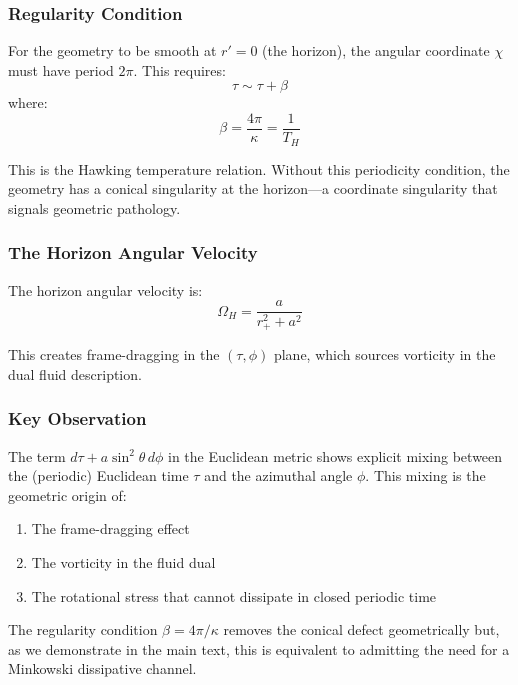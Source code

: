 \documentclass[11pt]{article}
\begin{document}
\subsubsection{Regularity Condition}

For the geometry to be smooth at $r' = 0$ (the horizon), the angular coordinate $\chi$ must have period $2\pi$. This requires:
\begin{equation}
\tau \sim \tau + \beta
\end{equation}
where:
\begin{equation}
\boxed{\beta = \frac{4\pi}{\kappa} = \frac{1}{T_H}}
\end{equation}

This is the Hawking temperature relation. Without this periodicity condition, the geometry has a conical singularity at the horizon—a coordinate singularity that signals geometric pathology.

\subsubsection{The Horizon Angular Velocity}

The horizon angular velocity is:
\begin{equation}
\Omega_H = \frac{a}{r_+^2 + a^2}
\end{equation}

This creates frame-dragging in the $(\tau, \phi)$ plane, which sources vorticity in the dual fluid description.

\subsubsection{Key Observation}

The term $d\tau + a\sin^2\theta\, d\phi$ in the Euclidean metric shows explicit mixing between the (periodic) Euclidean time $\tau$ and the azimuthal angle $\phi$. This mixing is the geometric origin of:
\begin{enumerate}
\item The frame-dragging effect
\item The vorticity in the fluid dual
\item The rotational stress that cannot dissipate in closed periodic time
\end{enumerate}

The regularity condition $\beta = 4\pi/\kappa$ removes the conical defect geometrically but, as we demonstrate in the main text, this is equivalent to admitting the need for a Minkowski dissipative channel.
\end{document}
